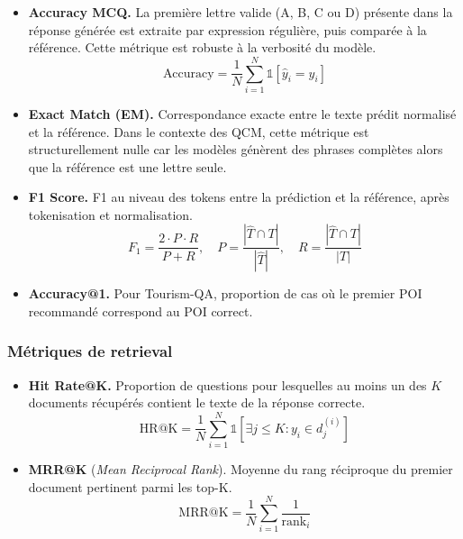 \documentclass[12pt,a4paper]{article}
\begin{document}
\begin{itemize}[leftmargin=*]
  \item \textbf{Accuracy MCQ.} La premi\`ere lettre valide (A, B, C ou D) pr\'esente dans la r\'eponse g\'en\'er\'ee est extraite par expression r\'eguli\`ere, puis compar\'ee \`a la r\'ef\'erence. Cette m\'etrique est robuste \`a la verbosit\'e du mod\`ele.
  \begin{equation}
    \text{Accuracy} = \frac{1}{N} \sum_{i=1}^{N} \mathbb{1}[\hat{y}_i = y_i]
  \end{equation}

  \item \textbf{Exact Match (EM).} Correspondance exacte entre le texte pr\'edit normalis\'e et la r\'ef\'erence. Dans le contexte des QCM, cette m\'etrique est structurellement nulle car les mod\`eles g\'en\`erent des phrases compl\`etes alors que la r\'ef\'erence est une lettre seule.

  \item \textbf{F1 Score.} F1 au niveau des tokens entre la pr\'ediction et la r\'ef\'erence, apr\`es tokenisation et normalisation.
  \begin{equation}
    F_1 = \frac{2 \cdot P \cdot R}{P + R}, \quad P = \frac{|\hat{T} \cap T|}{|\hat{T}|}, \quad R = \frac{|\hat{T} \cap T|}{|T|}
  \end{equation}

  \item \textbf{Accuracy@1.} Pour Tourism-QA, proportion de cas o\`u le premier POI recommand\'e correspond au POI correct.
\end{itemize}

\subsubsection{M\'etriques de retrieval}

\begin{itemize}[leftmargin=*]
  \item \textbf{Hit Rate@K.} Proportion de questions pour lesquelles au moins un des $K$ documents r\'ecup\'er\'es contient le texte de la r\'eponse correcte.
  \begin{equation}
    \text{HR@K} = \frac{1}{N} \sum_{i=1}^{N} \mathbb{1}\left[\exists j \leq K : y_i \in d_j^{(i)}\right]
  \end{equation}

  \item \textbf{MRR@K} (\textit{Mean Reciprocal Rank}). Moyenne du rang r\'eciproque du premier document pertinent parmi les top-K.
  \begin{equation}
    \text{MRR@K} = \frac{1}{N} \sum_{i=1}^{N} \frac{1}{\text{rank}_i}
  \end{equation}
\end{itemize}
\end{document}
